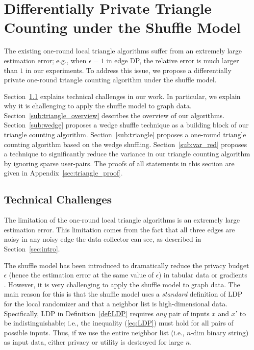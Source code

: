 \section{Differentially Private Triangle Counting under the Shuffle Model}
\label{sec:triangle}
The existing one-round local triangle algorithms \cite{Imola_USENIX21,Imola_USENIX22,Ye_ICDE20,Ye_TKDE21} suffer from an extremely large estimation error; e.g., when $\epsilon=1$ in edge DP, the relative error is much larger than $1$ in our experiments. 
To address this issue, we propose a differentially private one-round triangle counting algorithm under the shuffle model. 

Section~\ref{sub:challenges} explains technical challenges in our work. 
In particular, we explain why it is challenging to apply the shuffle model to graph data. 
Section~\ref{sub:triangle_overview} describes the overview of our algorithms. 
Section~\ref{sub:wedge} proposes a wedge shuffle technique as a building block of our triangle counting algorithm. 
Section~\ref{sub:triangle} proposes a one-round triangle counting algorithm based on the wedge shuffling. 
Section~\ref{sub:var_red} proposes a technique to significantly reduce the variance in our triangle counting algorithm by ignoring sparse user-pairs. 
The proofs of all statements in this section are given in Appendix~\ref{sec:triangle_proof}. 

\subsection{Technical Challenges}
\label{sub:challenges}
The limitation of the one-round local triangle algorithms is an extremely large estimation error. 
This limitation comes from the fact that all three edges are noisy in any noisy edge the data collector can see, as described in Section~\ref{sec:intro}. 

The shuffle model has been introduced to dramatically reduce the privacy budget $\epsilon$ (hence the estimation error at the same value of $\epsilon$) in tabular data \cite{Wang_PVLDB20} or 
gradients 
\cite{Girgis_AISTATS21,Liu_AAAI21}. 
However, it is very challenging to apply the shuffle model to graph data. 
The main reason for this is that 
the shuffle model uses a \textit{standard} definition of LDP for the local randomizer and that a neighbor list is high-dimensional data. 
Specifically, LDP in Definition~\ref{def:LDP} requires \textit{any} pair of inputs $x$ and $x'$ to be indistinguishable; i.e., 
the inequality (\ref{eq:LDP}) must hold for all pairs of possible inputs. 
Thus, if we use the entire neighbor list (i.e., $n$-dim binary string) as input data, 
either privacy or utility is destroyed for large $n$. 

